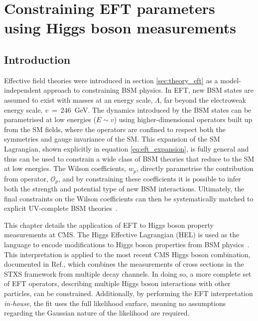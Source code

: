 \chapter{Constraining EFT parameters using Higgs boson measurements}
\label{chap:eft}

\section{Introduction}

Effective field theories were introduced in section \ref{sec:theory_eft} as a model-independent approach to constraining BSM physics. In EFT, new BSM states are assumed to exist with masses at an energy scale, $\Lambda$, far beyond the electroweak energy scale, $v$~=~246~GeV. The dynamics introduced by the BSM states can be parametrised at low energies ($E \sim v$) using higher-dimensional operators built up from the SM fields, where the operators are confined to respect both the symmetries and gauge invariance of the SM. This expansion of the SM Lagrangian, shown explicitly in equation \ref{eq:eft_expansion}, is fully general and thus can be used to constrain a wide class of BSM theories that reduce to the SM at low energies. The Wilson coefficients, $w_p$, directly parametrise the contribution from operator, $\mathcal{O}_p$, and by constraining these coefficients it is possible to infer both the strength and potential type of new BSM interactions. Ultimately, the final constraints on the Wilson coefficients can then be systematically matched to explicit UV-complete BSM theories~\cite{}.

This chapter details the application of EFT to Higgs boson property measurements at CMS. The Higgs Effective Lagrangian (HEL) is used as the language to encode modifications to Higgs boson properties from BSM physics~\cite{Contino:2013kra,Alloul:2013naa}. This interpretation is applied to the most recent CMS Higgs boson combination, documented in Ref.\cite{CMS-PAS-HIG-19-005}, which combines the measurements of cross sections in the STXS framework from multiple decay channels. In doing so, a more complete set of EFT operators, describing multiple Higgs boson interactions with other particles, can be constrained. Additionally, by performing the EFT interpretation \textit{in-house}, the fit uses the full likelihood surface, meaning no assumptions regarding the Gaussian nature of the likelihood are required.

